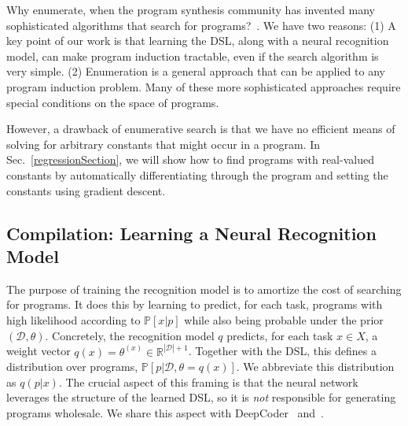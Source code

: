 \documentclass{article}
\newcommand{\probability}{\mathds{P}} %
\begin{document}
Why enumerate, when the program synthesis community has invented many
sophisticated algorithms that search for programs?~\cite{solar2008program,schkufza2013stochastic,feser2015synthesizing,osera2015type,polozov2015flashmeta,polikarpova2016program}.
We have two reasons:
(1) A key point of our work is that learning the DSL, along with a neural recognition model, can make program induction tractable, even if the search algorithm is very simple.
(2) Enumeration is a general approach that can be applied to any program induction problem. Many of these more sophisticated approaches require special conditions on
  the space of  programs.

  However, a drawback of   enumerative search  is that we have no
efficient means of solving for arbitrary constants that might occur in a
program. In Sec.~\ref{regressionSection},
we will show how to find programs with real-valued constants
by automatically differentiating through the program and setting the constants using gradient descent.







\subsection{Compilation: Learning a Neural Recognition Model}\label{recognitionSection}

The purpose of training the recognition model is to amortize the cost of searching for
programs.  It does this by learning to predict, for each task,
programs with high likelihood according to 
$\probability[x|p]$ while also being
probable under the prior $(\mathcal{D},\theta)$.  Concretely,
the recognition model $q$ predicts, for each
task $x\in X$, a weight vector $q(x) = \theta^{(x)}\in
\mathbb{R}^{|\mathcal{D}| + 1}$.  Together with the DSL, this defines
a distribution over programs, $\probability[p|\mathcal{D},\theta =
  q(x)]$.  We abbreviate this distribution as $q(p|x)$.  The crucial
aspect of this framing is that the neural network leverages the
structure of the learned DSL, so it is \emph{not} responsible for
generating programs wholesale.  We share this aspect with
DeepCoder~\cite{balog2016deepcoder} and~\cite{menon2013machine}.
\end{document}

